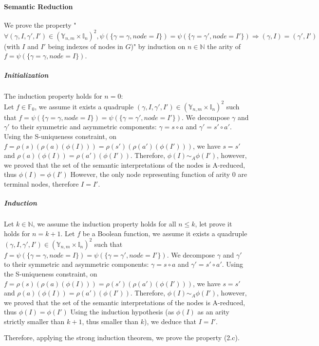 \documentclass[a4paper,10pt]{article}
\newcommand{\N}{\mathbb{N}}%
\newcommand{\F}{\mathbb{F}}%
\newcommand{\Y}{\mathbb{Y}}%
\newcommand{\I}{\mathbb{I}}%
\begin{document}
\paragraph{Semantic Reduction}
We prove the property "$\forall (\gamma, I, \gamma', I') \in (\Y_{n, m} \times \I_n)^2, \psi(\{\gamma = \gamma, node = I\}) = \psi(\{\gamma = \gamma', node = I'\}) \Rightarrow (\gamma, I) = (\gamma', I')$ (with $I$ and $I'$ being indexes of nodes in $G$)" by induction on $n\in\N$ the arity of $f = \psi(\{\gamma = \gamma, node = I\})$.

\subparagraph{Initialization}
The induction property holds for $n = 0$:\\
Let $f\in\F_0$, we assume it exists a quadruple $(\gamma, I, \gamma', I') \in (\Y_{n, m} \times \I_n)^2$ such that $f = \psi(\{\gamma = \gamma, node = I\}) = \psi(\{\gamma = \gamma', node = I'\})$.
We decompose $\gamma$ and $\gamma'$ to their symmetric and asymmetric components: $\gamma = s \circ a$ and $\gamma' = s' \circ a'$.
Using the S-uniqueness constraint, on $f = \rho(s)(\rho(a)(\phi(I))) = \rho(s')(\rho(a')(\phi(I')))$, we have $s = s'$ and $\rho(a)(\phi(I)) = \rho(a')(\phi(I'))$.
Therefore, $\phi(I) \sim_A \phi(I')$, however, we proved that the set of the semantic interpretations of the nodes is A-reduced, thus $\phi(I) = \phi(I')$
However, the only node representing function of arity 0 are terminal nodes, therefore $I = I'$.

\subparagraph{Induction}
Let $k\in\N$, we assume the induction property holds for all $n\leq k$, let prove it holds for $n = k+1$.
Let $f$ be a Boolean function, we assume it exists a quadruple $(\gamma, I, \gamma', I') \in (\Y_{n, m} \times \I_n)^2$ such that $f = \psi(\{\gamma = \gamma, node = I\}) = \psi(\{\gamma = \gamma', node = I'\})$.
We decompose $\gamma$ and $\gamma'$ to their symmetric and asymmetric components: $\gamma = s \circ a$ and $\gamma' = s' \circ a'$.
Using the S-uniqueness constraint, on $f = \rho(s)(\rho(a)(\phi(I))) = \rho(s')(\rho(a')(\phi(I')))$, we have $s = s'$ and $\rho(a)(\phi(I)) = \rho(a')(\phi(I'))$.
Therefore, $\phi(I) \sim_A \phi(I')$, however, we proved that the set of the semantic interpretations of the nodes is A-reduced, thus $\phi(I) = \phi(I')$
Using the induction hypothesis (as $\phi(I)$ as an arity strictly smaller than $k+1$, thus smaller than $k$), we deduce that $I = I'$.

Therefore, applying the strong induction theorem, we prove the property (2.c).
\end{document}
